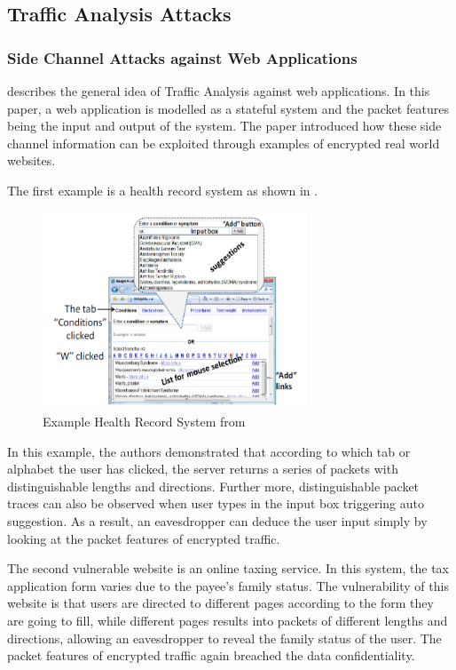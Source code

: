 \subsection{Traffic Analysis Attacks}

\subsubsection{Side Channel Attacks against Web Applications}
\cite{WebSideChannel} describes the general idea of Traffic Analysis against web applications. In this paper, a web application is modelled as a stateful system and the packet features being the input and output of the system. The paper introduced how these side channel information can be exploited through examples of encrypted real world websites.
\begin{example}
	The first example is a health record system as shown in .
	
	\begin{figure}[h!]
		\center
		\includegraphics[width=0.7\textwidth]{fig/WebSideChannelExample1.png}
		\caption{Example Health Record System from \cite{WebSideChannel}}
		\label{Fig: HealthRecordSystem}
	\end{figure}
	
	In this example, the authors demonstrated that according to which tab or alphabet the user has clicked, the server returns a series of  packets with distinguishable lengths and directions. Further more, distinguishable packet traces can also be observed when user types in the input box triggering auto suggestion. As a result, an eavesdropper can deduce the user input simply by looking at the packet features of encrypted traffic.
\end{example}

\begin{example}
	The second vulnerable website is an online taxing service. In this system, the tax application form varies due to the payee's family status. The vulnerability of this website is that users are directed to different pages according to the form they are going to fill, while different pages results into packets of different lengths and directions, allowing an eavesdropper to reveal the family status of the user. The packet features of encrypted traffic again breached the data confidentiality.
\end{example}

